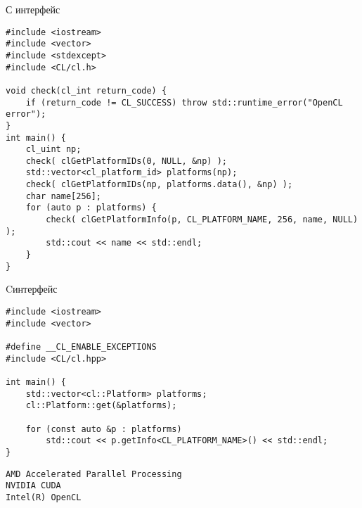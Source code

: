 \documentclass[@BEAMER_OPTIONS@]{beamer}
\newcommand{\CXX}{{\rm C}\plusplus}
\begin{document}
\begin{frame}[fragile]{С интерфейс}
    \begin{exampleblock}{}
        \begin{lstlisting}
#include <iostream>
#include <vector>
#include <stdexcept>
#include <CL/cl.h>

void check(cl_int return_code) {
    if (return_code != CL_SUCCESS) throw std::runtime_error("OpenCL error");
}
int main() {
    cl_uint np;
    check( clGetPlatformIDs(0, NULL, &np) );
    std::vector<cl_platform_id> platforms(np);
    check( clGetPlatformIDs(np, platforms.data(), &np) );
    char name[256];
    for (auto p : platforms) {
        check( clGetPlatformInfo(p, CL_PLATFORM_NAME, 256, name, NULL) );
        std::cout << name << std::endl;
    }
}
        \end{lstlisting}
    \end{exampleblock}
\end{frame}

\begin{frame}[fragile]{\CXX интерфейс}
    \begin{exampleblock}{}
        \begin{lstlisting}
#include <iostream>
#include <vector>

#define __CL_ENABLE_EXCEPTIONS
#include <CL/cl.hpp>

int main() {
    std::vector<cl::Platform> platforms;
    cl::Platform::get(&platforms);

    for (const auto &p : platforms)
        std::cout << p.getInfo<CL_PLATFORM_NAME>() << std::endl;
}
        \end{lstlisting}
    \end{exampleblock}
    \begin{exampleblock}{}
        \begin{verbatim}
AMD Accelerated Parallel Processing
NVIDIA CUDA
Intel(R) OpenCL
        \end{verbatim}
    \end{exampleblock}
\end{frame}
\end{document}
